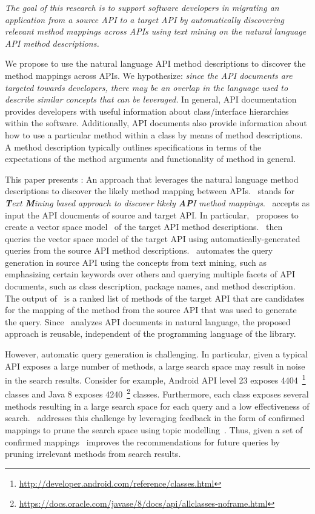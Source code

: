\textit{The goal of this research is to support software developers 
	in migrating an application from a source API to a target API
	by automatically discovering relevant method mappings across APIs using text mining
	on the natural language API method descriptions.}

We propose to use the natural language API method descriptions
to discover the method mappings across APIs.
We hypothesize:
\textit{since the API documents are targeted towards developers,
	there may be an overlap in the language used to describe similar concepts that can be leveraged.}
In general, API documentation provides developers with useful information
about class/interface hierarchies within the software.
Additionally, API documents also provide information about
how to use a particular method within a class by means of method descriptions.
A method description typically outlines specifications in terms of
the expectations of the method arguments and functionality of method in general.


This paper presents \tool : An approach that leverages the natural language method descriptions to discover the likely method mapping between APIs.
\tool\ stands for \textit{\textbf{T}ext \textbf{M}ining
	based approach to discover likely \textbf{AP}I method mappings}.
\tool\ accepts as input the API doucments of source and target API.
In particular, \tool\ proposes to create a vector space model~\cite{singhal2001modern,manning2008introduction} of the target API method descriptions. 
\tool\ then queries the vector space model of the target API using
automatically-generated queries from the source API method descriptions.
\tool\ automates the query generation in source API using the concepts from text mining, such as emphasizing certain keywords over others and querying multiple facets of API documents, such as class description, package names, and method description.
The output of \tool\ is a ranked list of methods of the target API that are candidates for the mapping of the method from the source API that was used to generate the query.
Since \tool\ analyzes API documents in natural language, the proposed approach is reusable, independent of the programming language of the library.


However, automatic query generation is challenging. In particular, given a typical API exposes a large number of methods, a large search space may result in noise in the search results.
Consider for example, Android API level 23 exposes 4404~\footnote{\url{http://developer.android.com/reference/classes.html}} classes
and Java 8 exposes 4240~\footnote{\url{https://docs.oracle.com/javase/8/docs/api/allclasses-noframe.html}} classes.
Furthermore, each class exposes several methods resulting in a large search space for each query and a low effectiveness of search. 
\tool\ addresses this challenge by leveraging feedback in the form of confirmed mappings to prune the search space using topic modelling~\cite{blei2003latent,panichella2013effectively}.
Thus, given a set of confirmed mappings \tool\ improves the recommendations for future queries by pruning irrelevant methods from search results.



